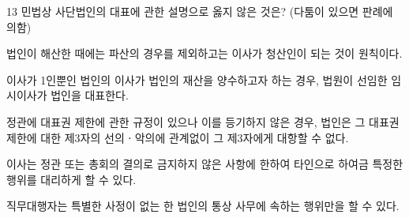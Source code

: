 \begin{question}{13}
민법상 사단법인의 대표에 관한 설명으로 옳지 않은 것은? (다툼이 있으면 판례에 의함)
\begin{choices}
  \item 법인이 해산한 때에는 파산의 경우를 제외하고는 이사가 청산인이 되는 것이 원칙이다.
  \item 이사가 1인뿐인 법인의 이사가 법인의 재산을 양수하고자 하는 경우, 법원이 선임한 임시이사가 법인을 대표한다.
  \item 정관에 대표권 제한에 관한 규정이 있으나 이를 등기하지 않은 경우, 법인은 그 대표권 제한에 대한 제3자의 선의ㆍ악의에 관계없이 그 제3자에게 대항할 수 없다.
  \item 이사는 정관 또는 총회의 결의로 금지하지 않은 사항에 한하여 타인으로 하여금 특정한 행위를 대리하게 할 수 있다.
  \item 직무대행자는 특별한 사정이 없는 한 법인의 통상 사무에 속하는 행위만을 할 수 있다.
\end{choices}
\end{question}
